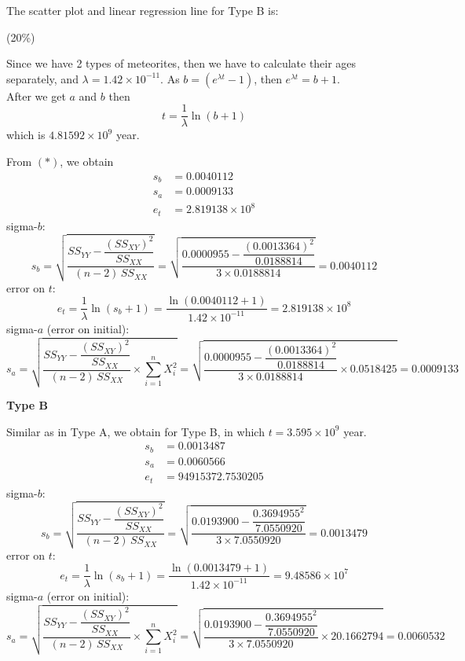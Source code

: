 \begin{description}
  The scatter plot and linear regression line for Type B is:

  \hfill(20\%)

\item[5.] Since we have 2 types of meteorites, then we have to calculate their
  ages separately, and $\lambda = 1.42 \times 10^{-11}$. As
  $b = \left(e^{\lambda t} - 1\right)$, then $e^{\lambda t} = b + 1$.\\
  After we get $a$ and $b$ then
  \[
    t = \frac{1}{\lambda}\ln(b + 1)
  \]
  which is $4.81592 \times 10^{9}$ year.

  From $(*)$, we obtain
  \begin{align*}
    s_b &= 0.0040112\\
    s_a &= 0.0009133\\
    e_t &= 2.819138 \times 10^{8}
  \end{align*}
  sigma-$b$:
  \[
    s_b = \sqrt{\frac{SS_{YY} - \dfrac{(SS_{XY})^2}{SS_{XX}}}
                     {(n-2)\,SS_{XX}}}
        = \sqrt{\frac{0.0000955 - \dfrac{(0.0013364)^2}{0.0188814}}
                     {3 \times 0.0188814}}
        = 0.0040112
  \]
  error on $t$:
  \[
    e_t = \frac{1}{\lambda}\ln(s_b + 1)
        = \frac{\ln(0.0040112 + 1)}{1.42 \times 10^{-11}}
        = 2.819138 \times 10^{8}
  \]
  sigma-$a$ (error on initial):
  \[
    s_a = \sqrt{\frac{SS_{YY} - \dfrac{(SS_{XY})^2}{SS_{XX}}}
                     {(n-2)\,SS_{XX}} \times \sum_{i=1}^{n} X_i^2}
        = \sqrt{\frac{0.0000955 - \dfrac{(0.0013364)^2}{0.0188814}}
                     {3 \times 0.0188814} \times 0.0518425}
        = 0.0009133
  \]

  \textbf{Type B}

  Similar as in Type A, we obtain for Type B, in which
  $t = 3.595 \times 10^{9}$ year.
  \begin{align*}
    s_b &= 0.0013487\\ %
    s_a &= 0.0060566\\ %
    e_t &= 94915372.7530205
  \end{align*}
  sigma-$b$:
  \[
    s_b = \sqrt{\frac{SS_{YY} - \dfrac{(SS_{XY})^2}{SS_{XX}}}
                     {(n-2)\,SS_{XX}}}
        = \sqrt{\frac{0.0193900 - \dfrac{0.3694955^2}{7.0550920}}
                     {3 \times 7.0550920}}
        = 0.0013479
  \]
  error on $t$:
  \[
    e_t = \frac{1}{\lambda}\ln(s_b + 1)
        = \frac{\ln(0.0013479 + 1)}{1.42 \times 10^{-11}}
        = 9.48586 \times 10^{7}
  \]
  sigma-$a$ (error on initial):
  \[
    s_a = \sqrt{\frac{SS_{YY} - \dfrac{(SS_{XY})^2}{SS_{XX}}}
                     {(n-2)\,SS_{XX}} \times \sum_{i=1}^{n} X_i^2}
        = \sqrt{\frac{0.0193900 - \dfrac{0.3694955^2}{7.0550920}}
                     {3 \times 7.0550920} \times 20.1662794}
        = 0.0060532
  \]


\end{description}
